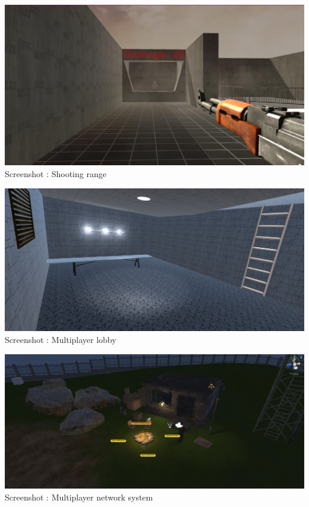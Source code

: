 \documentclass[12pt]{article}
\begin{document}
\newpage
\begin{center}	
	\includegraphics[scale = 0.60]{Screen_Damage-ConvertImage.jpg}\\[1cm]
    Screenshot : Shooting range
\end{center}
\newpage
\begin{center}	
	\includegraphics[scale = 0.25]{Multiplayer_lobby.jpg}\\[1cm]
    Screenshot : Multiplayer lobby
\end{center}
\newpage
\begin{center}	
	\includegraphics[scale = 0.60]{Network-Manager-ConvertImage.jpg}\\[1cm]
    Screenshot : Multiplayer network system
\end{center}
\newpage
\end{document}
